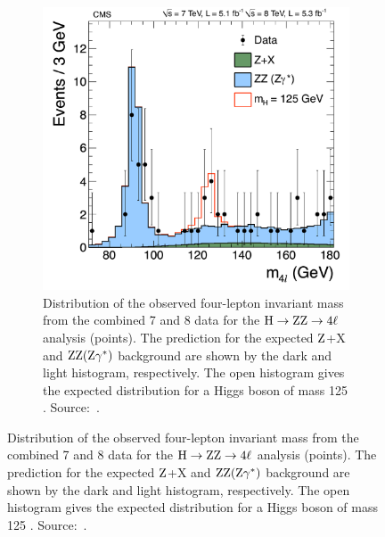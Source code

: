 \begin{figure}[htbp]
\begin{subfigure}[htbp]{0.48\textwidth}
    \includegraphics[width=\textwidth]{figures_and_tables/theory/higgs_discovery_hzz4l.pdf}
    \caption{ Distribution of the observed four-lepton invariant mass from the combined 7 and 8 \TeV data 
    for the $\mathrm{H} \to \mathrm{Z}\mathrm{Z}\to 4\ell$ analysis (points).
    The prediction for the expected $\mathrm{Z}$+X and $\mathrm{Z}\mathrm{Z}(\mathrm{Z}\gamma^*)$ background are shown by the dark and light histogram, respectively. The open histogram gives the expected distribution for a Higgs boson of mass 125 \GeV. Source:~\cite{higgs_discovery_cms}.}
    \label{higgs_discovery_hzz4l}
  \end{subfigure}
\end{figure}





